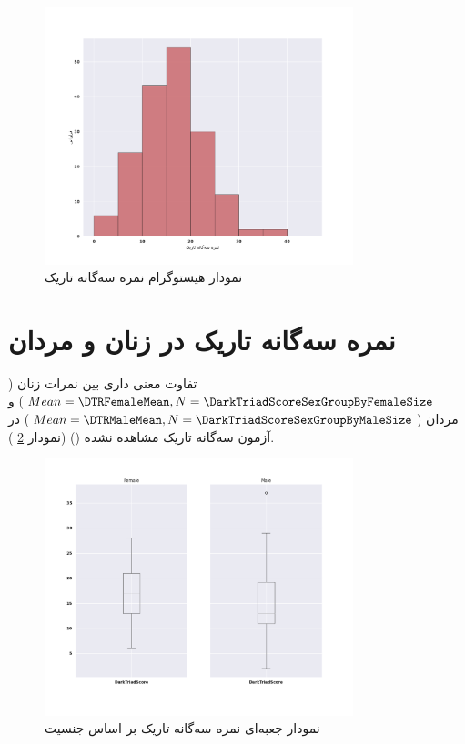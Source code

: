 \begin{figure}[htpb]
    \centering
    \includegraphics[width=0.8\textwidth]{./img/DTRHistogram.pdf}
    \caption{نمودار هیستوگرام نمره  سه‌گانه تاریک}
    \label{fig:DTRHistogram}
\end{figure}

\section{نمره سه‌گانه تاریک در زنان و مردان}
 تفاوت معنی داری بین نمرات زنان 
 ($Mean=\DTRFemaleMean,N=\DarkTriadScoreSexGroupByFemaleSize$)
 و مردان 
 ($Mean=\DTRMaleMean,N=\DarkTriadScoreSexGroupByMaleSize$)
 در آزمون سه‌گانه تاریک مشاهده نشده
\!(\DarkTriadScoreSexIndTTestPValue)
\!(نمودار
\ref{fig:BoxPlotDarkTriadScoreSex}
).

\begin{figure}[htpb]
    \centering
    \includegraphics[width=0.8\textwidth]{./img/BoxPlotDarkTriadScoreSex.png}
    \caption{نمودار جعبه‌ای نمره سه‌گانه تاریک بر اساس جنسیت}
    \label{fig:BoxPlotDarkTriadScoreSex}
\end{figure}

